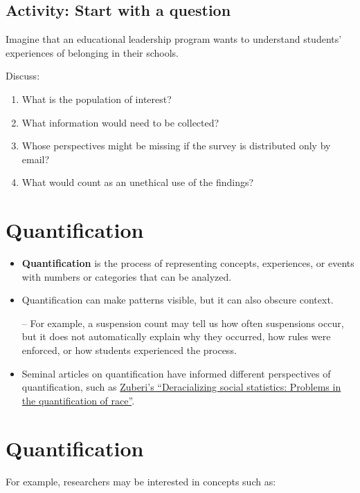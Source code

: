 \documentclass[
  letterpaper,
  DIV=11,
  numbers=noendperiod]{scrartcl}
\providecommand{\tightlist}{%
  \setlength{\itemsep}{0pt}\setlength{\parskip}{0pt}}\usepackage{longtable,booktabs,array}
\begin{document}
\subsection{Activity: Start with a
question}\label{activity-start-with-a-question}

Imagine that an educational leadership program wants to understand
students' experiences of belonging in their schools.

Discuss:

\begin{enumerate}
\def\labelenumi{\arabic{enumi}.}
\tightlist
\item
  What is the population of interest?
\item
  What information would need to be collected?
\item
  Whose perspectives might be missing if the survey is distributed only
  by email?
\item
  What would count as an unethical use of the findings?
\end{enumerate}

\section{Quantification}\label{quantification}

\begin{itemize}
\item
  \textbf{Quantification} is the process of representing concepts,
  experiences, or events with numbers or categories that can be
  analyzed.
\item
  Quantification can make patterns visible, but it can also obscure
  context.

  -- For example, a suspension count may tell us how often suspensions
  occur, but it does not automatically explain why they occurred, how
  rules were enforced, or how students experienced the process.
\item
  Seminal articles on quantification have informed different
  perspectives of quantification, such as
  \href{https://www.jstor.org/stable/1049479}{Zuberi's ``Deracializing
  social statistics: Problems in the quantification of race''}.
\end{itemize}

\section{Quantification}\label{quantification-1}

For example, researchers may be interested in concepts such as:
\end{document}

